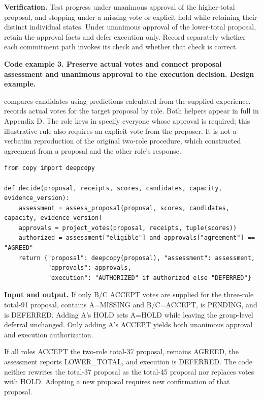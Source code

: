 \documentclass[10pt,a4paper]{article}
\begin{document}
\textbf{Verification.} Test progress under unanimous approval of the higher-total proposal, and stopping under a missing vote or explicit hold while retaining their distinct individual states. Under unanimous approval of the lower-total proposal, retain the approval facts and defer execution only. Record separately whether each commitment path invokes its check and whether that check is correct.

\textbf{Code example 3. Preserve actual votes and connect proposal assessment and unanimous approval to the execution decision. Design example.}

\texttt{} compares candidates using predictions calculated from the supplied experience. \texttt{} records actual votes for the target proposal by role. Both helpers appear in full in Appendix D. The role keys in \texttt{} specify everyone whose approval is required; this illustrative rule also requires an explicit vote from the proposer. It is not a verbatim reproduction of the original two-role procedure, which constructed agreement from a proposal and the other role's response.

\noindent\begin{minipage}{\linewidth}
\begin{verbatim}
from copy import deepcopy

def decide(proposal, receipts, scores, candidates, capacity, evidence_version):
    assessment = assess_proposal(proposal, scores, candidates, capacity, evidence_version)
    approvals = project_votes(proposal, receipts, tuple(scores))
    authorized = assessment["eligible"] and approvals["agreement"] == "AGREED"
    return {"proposal": deepcopy(proposal), "assessment": assessment,
            "approvals": approvals,
            "execution": "AUTHORIZED" if authorized else "DEFERRED"}
\end{verbatim}
\end{minipage}\par

\textbf{Input and output.} If only B/C ACCEPT votes are supplied for the three-role total-91 proposal, \texttt{} contains A=MISSING and B/C=ACCEPT, \texttt{} is PENDING, and \texttt{} is DEFERRED. Adding A's HOLD sets A=HOLD while leaving the group-level deferral unchanged. Only adding A's ACCEPT yields both unanimous approval and execution authorization.

If all roles ACCEPT the two-role total-37 proposal, \texttt{} remains AGREED, the assessment reports LOWER\_TOTAL, and execution is DEFERRED. The code neither rewrites the total-37 proposal as the total-45 proposal nor replaces votes with HOLD. Adopting a new proposal requires new confirmation of that proposal.
\end{document}
